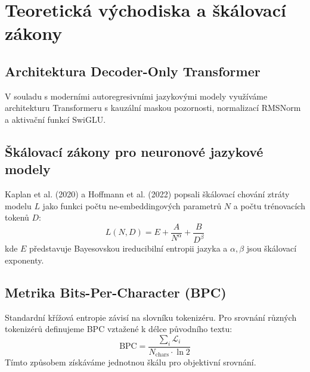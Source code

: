 \chapter{Teoretická východiska a škálovací zákony}
\label{chap:theory}

\section{Architektura Decoder-Only Transformer}
V souladu s moderními autoregresivními jazykovými modely \cite{vaswani2017attention} využíváme architekturu Transformeru s kauzální maskou pozornosti, normalizací RMSNorm a aktivační funkcí SwiGLU.

\section{Škálovací zákony pro neuronové jazykové modely}
Kaplan et al. (2020) \cite{kaplan2020scaling} a Hoffmann et al. (2022) \cite{hoffmann2022training} popsali škálovací chování ztráty modelu $L$ jako funkci počtu ne-embeddingových parametrů $N$ a počtu trénovacích tokenů $D$:
\begin{equation}
    L(N, D) = E + \frac{A}{N^\alpha} + \frac{B}{D^\beta}
\end{equation}
kde $E$ představuje Bayesovskou ireducibilní entropii jazyka a $\alpha, \beta$ jsou škálovací exponenty.

\section{Metrika Bits-Per-Character (BPC)}
Standardní křížová entropie závisí na slovníku tokenizéru. Pro srovnání různých tokenizérů definujeme BPC vztažené k délce původního textu:
\begin{equation}
    \text{BPC} = \frac{\sum_{i} \mathcal{L}_i}{N_{\text{chars}} \cdot \ln 2}
\end{equation}
Tímto způsobem získáváme jednotnou škálu pro objektivní srovnání.
